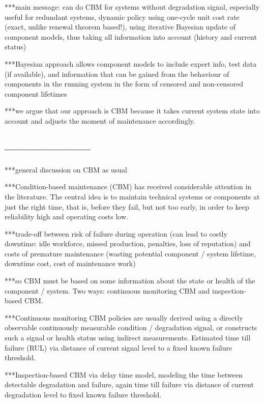 \documentclass[authoryear]{elsarticle}
\begin{document}
***main message:
can do CBM for systems without degradation signal,
especially useful for redundant systems,
dynamic policy using one-cycle unit cost rate (exact, unlike renewal theorem based!),
using iterative Bayesian update of component models,
thus taking all information into account (history and current status)

***Bayesian approach allows component models to include expert info, test data (if available),
and information that can be gained from the behaviour of components in the running system
in the form of censored and non-censored component lifetimes 

***we argue that our approach is CBM because it takes current system state into account
and adjusts the moment of maintenance accordingly.

\subsection*{---------------------}
***general discussion on CBM as usual

***Condition-based maintenance (CBM) has received considerable attention in the literature.
The central idea is to maintain technical systems or components at just the right time,
that is, before they fail,
but not too early, in order to keep reliability high and operating costs low.

***trade-off between risk of failure during operation
(can lead to costly downtime: idle workforce, missed production, penalties, loss of reputation)
and costs of premature maintenance
(wasting potential component / system lifetime, downtime cost, cost of maintenance work)

***so CBM must be based on some information about the state or health of the component / system.
Two ways: continuous monitoring CBM and inspection-based CBM.

***Continuous monitoring CBM policies are usually derived
using a directly observable continuously measurable condition / degradation signal,
or constructs such a signal or health status using indirect measurements.
Estimated time till failure (RUL) \citep{2014:rul-review, 2011:rul-review-statistical}
via distance of current signal level to a fixed known failure threshold.

***Inspection-based CBM via delay time model, modeling the time between detectable degradation and failure,
again time till failure via distance of current degradation level to fixed known failure threshold.
\end{document}
